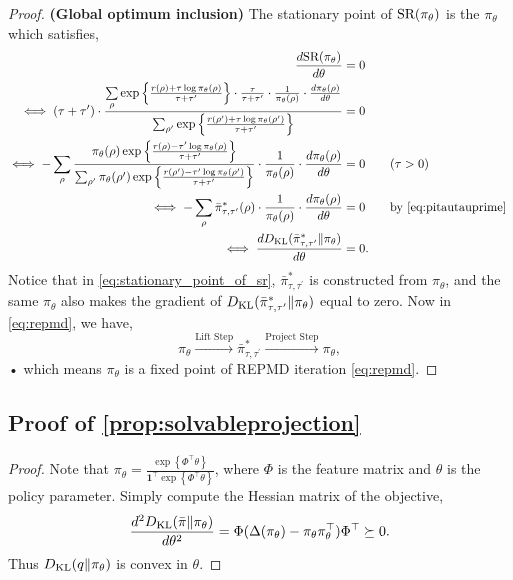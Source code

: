\begin{proof}
	{\bf (Global optimum inclusion)} The stationary point of $\text{SR}(\pi_{\theta})$ is the $\pi_\theta$ which satisfies,
	\begin{equation}
	\label{eq:stationary_point_of_sr}
	\begin{split}
		\frac{d \SR(\pi_{\theta})}{d \theta} &= 0 \\
		\iff (\tau + \tau^\prime) \cdot \frac{ \sum\limits_{\rho}{ \exp\left\{ \frac{r(\rho) + \tau \log{\pi_\theta(\rho)} }{\tau + \tau^{\prime}} \right\} } \cdot \frac{\tau}{ \tau + \tau^\prime} \cdot \frac{1}{ \pi_\theta(\rho)} \cdot \frac{d \pi_{\theta}(\rho)}{d \theta} }{  \sum_{\rho^\prime}{ \exp\left\{ \frac{r(\rho^\prime) + \tau \log{\pi_\theta(\rho^\prime)} }{\tau + \tau^{\prime}} \right\} } } &= 0 \\
		\iff - \sum\limits_{\rho}{ \frac{ \pi_\theta(\rho) \exp\left\{ \frac{r(\rho) - \tau^\prime \log{\pi_\theta(\rho)} }{\tau + \tau^{\prime}} \right\}  }{  \sum_{\rho^\prime}{ \pi_\theta(\rho^\prime) \exp\left\{ \frac{r(\rho^\prime) - \tau^\prime \log{\pi_\theta(\rho^\prime)} }{\tau + \tau^{\prime}} \right\} } } \cdot \frac{1}{ \pi_\theta(\rho)} \cdot \frac{d \pi_{\theta}(\rho)}{d \theta} } &= 0 \qquad (\tau > 0) \\
		\iff - \sum\limits_{\rho}{ \bar{\pi}_{\tau,\tau^{\prime}}^*(\rho) \cdot \frac{1}{ \pi_\theta(\rho)} \cdot \frac{d \pi_{\theta}(\rho)}{d \theta} } &= 0 \qquad \text{by \cref{eq:pitautauprime} } \\
		\iff \frac{d \KL( \bar{\pi}_{\tau,\tau^{\prime}}^* \| \pi_{\theta}) }{d \theta} &= 0.
	\end{split}
	\end{equation}
	Notice that in \cref{eq:stationary_point_of_sr}, $\bar{\pi}_{\tau,\tau^{\prime}}^*$ is constructed from $\pi_\theta$, and the same $\pi_\theta$ also makes the gradient of $D_{\mathrm{KL}}( \bar{\pi}_{\tau,\tau^{\prime}}^* \| \pi_{\theta})$ equal to zero. Now in \cref{eq:repmd}, we have,
	\begin{equation*}
		\pi_\theta \xrightarrow{\text{Lift Step}} \bar{\pi}_{\tau,\tau^{\prime}}^* \xrightarrow{\text{Project Step}} \pi_\theta,
	\end{equation*}•
	which means $\pi_{\theta}$ is a fixed point of REPMD iteration \cref{eq:repmd}.
\end{proof}

\subsection{Proof of \cref{prop:solvableprojection}}
\begin{proof}
	Note that $\pi_{\theta} = \frac{\exp\left\{\Phi^\top\theta\right\}}{{\mathbf{1}^\top \exp\left\{\Phi^\top\theta\right\} }}$, where $\Phi$ is the feature matrix and $\theta$ is the policy parameter.
	Simply compute the Hessian matrix of the objective,
	 \[\frac{d^2 D_{\mathrm{KL}}(\bar{\pi} \| \pi_{\theta})}{d \theta^2} = \Phi (\Delta(\pi_\theta) - \pi_\theta \pi_\theta^\top) \Phi^\top \succeq 0.
	 \]
	 Thus $D_{\mathrm{KL}}(q \| \pi_{\theta})$ is convex in $\theta$.
\end{proof}

